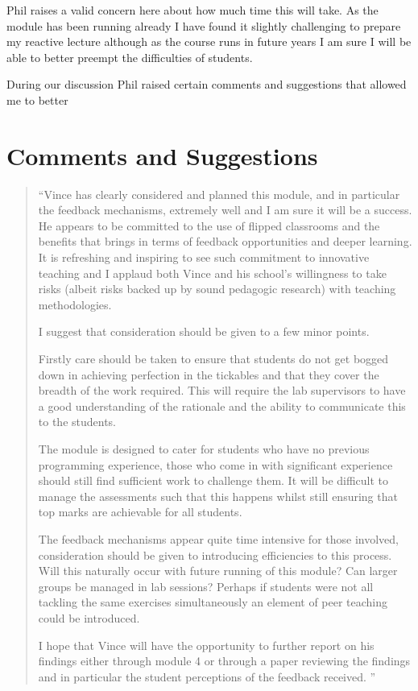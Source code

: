 \documentclass{article}
\begin{document}
Phil raises a valid concern here about how much time this will take. As the module has been running already I have found it slightly challenging to prepare my reactive lecture although as the course runs in future years I am sure I will be able to better preempt the difficulties of students.

During our discussion Phil raised certain comments and suggestions that allowed me to better

\section{Comments and Suggestions}

\begin{quote}
``Vince has clearly considered and planned this module, and in particular the feedback mechanisms, extremely well and I am sure it will be a success.  He appears to be committed to the use of flipped classrooms and the benefits that brings in terms of feedback opportunities and deeper learning.  It is refreshing and inspiring to see such commitment to innovative teaching and I applaud both Vince and his school's willingness to take risks (albeit risks backed up by sound pedagogic research) with teaching methodologies.

I suggest that consideration should be given to a few minor points.

Firstly care should be taken to ensure that students do not get bogged down in achieving perfection in the tickables and that they cover the breadth of the work required.  This will require the lab supervisors to have a good understanding of the rationale and the ability to communicate this to the students.

The module is designed to cater for students who have no previous programming experience, those who come in with significant experience should still find sufficient work to challenge them.  It will be difficult to manage the assessments such that this happens whilst still ensuring that top marks are achievable for all students.

The feedback mechanisms appear quite time intensive for those involved, consideration should be given to introducing efficiencies to this process.  Will this naturally occur with future running of this module?  Can larger groups be managed in lab sessions?  Perhaps if students were not all tackling the same exercises simultaneously an element of peer teaching could be introduced.

I hope that Vince will have the opportunity to further report on his findings either through module 4 or through a paper reviewing the findings and in particular the student perceptions of the feedback received.  ''
\end{quote}
\end{document}

